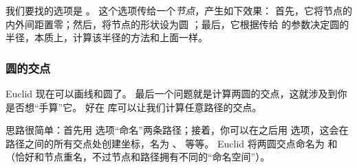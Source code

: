 我们要找的选项是 。
这个选项传给一个\emph{节点}，产生如下效果：
首先，它将节点的内外间距置零；然后，将节点的形状设为圆 ；最后，它根据传给  的参数决定圆的半径，本质上，计算该半径的方法和上面一样。

\eohs

\begin{codeexample}[]
\end{codeexample}


\subsubsection{圆的交点}

\bohs

Euclid 现在可以画线和圆了。
最后一个问题就是计算两圆的交点，这就涉及到你是否想“手算”它。
好在  库可以让我们计算任意路径的交点。

思路很简单：首先用  选项“命名”两条路径；接着，你可以在之后用  选项，这会在路径之间的所有交点处创建坐标，名为 、 等等。
Euclid 将两圆交点命名为  和 （恰好和节点重名，不过节点和路径拥有不同的“命名空间”）。

